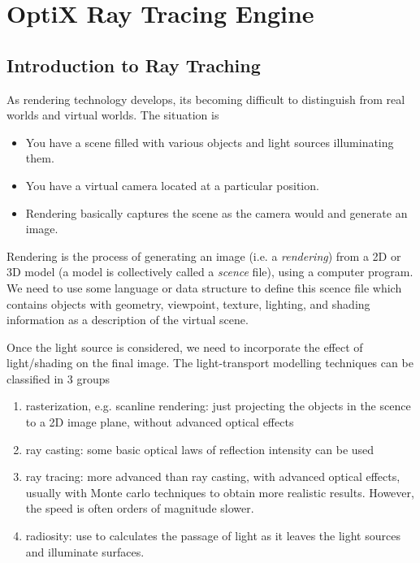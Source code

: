 \chapter{OptiX Ray Tracing Engine}
\label{chap:OptiX}


\section{Introduction to Ray Traching}

As rendering technology develops, its becoming difficult to distinguish from
real worlds and virtual worlds. The situation is
\begin{itemize}
  \item You have a scene filled with various objects and light sources illuminating them.

  \item You have a virtual camera located at a particular position.

  \item Rendering basically captures the scene as the camera would and
  generate an image.
\end{itemize}

Rendering is the process of generating an image (i.e. a {\it rendering}) from a
2D or 3D model (a model is collectively called a {\it scence} file), using a
computer program. We need to use some language or data structure to define this
scence file which contains objects with geometry, viewpoint, texture,
lighting, and shading information as a description of the virtual scene. 

Once the light source is considered, we need to incorporate the effect of
light/shading on the final image. The light-transport modelling
techniques can be classified in 3 groups
\begin{enumerate}
  \item rasterization, e.g. scanline rendering: just projecting the objects in
  the scence to a 2D image plane, without advanced optical effects
  
  \item ray casting: some basic optical laws of reflection intensity can be used
  
  \item ray tracing: more advanced than ray casting, with advanced optical
  effects, usually with Monte carlo techniques to obtain more realistic results.
  However, the speed is often orders of magnitude slower.
  
  \item radiosity: use to calculates the passage of light as it leaves the light
  sources and illuminate surfaces.
\end{enumerate}

